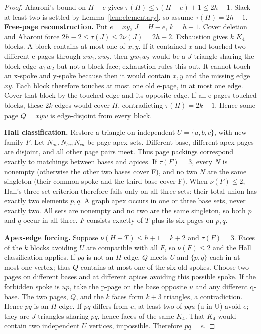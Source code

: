\documentclass[11pt]{article}
\theoremstyle{definition}\newtheorem{definition}[theorem]{Definition}
\theoremstyle{remark}\newtheorem{remark}[theorem]{Remark}
\begin{document}
\begin{proof}\leavevmode
Aharoni's bound on $H-e$ gives $\tau(H)\le\tau(H-e)+1\le2h-1$. Slack at least two is settled by Lemma~\ref{lem:elementary}, so assume $\tau(H)=2h-1$.
\textbf{Free-page reconstruction.} Put \(e=xy\), \(J=H-e\), \(k=h-1\). Cover deletion and Aharoni force \(2h-2\le \tau(J)\le 2\nu(J)=2h-2\). Exhaustion gives \(k\) \(K_4\) blocks. A block contains at most one of \(x,y\). If it contained \(x\) and touched two different e-pages through \(xw_1,xw_2\), then \(yw_1w_2\) would be a \(J\)-triangle sharing the block edge \(w_1w_2\) but not a block face; exhaustion rules this out. It cannot touch an x-spoke and y-spoke because then it would contain \(x,y\) and the missing edge \(xy\). Each block therefore touches at most one old e-page, in at most one edge. Cover that block by the touched edge and its opposite edge. If all e-pages touched blocks, these \(2k\) edges would cover \(H\), contradicting \(\tau(H)=2k+1\). Hence some page \(Q=xyw\) is edge-disjoint from every block.

\textbf{Hall classification.} Restore a triangle on independent \(U=\{a,b,c\}\), with new family \(F\). Let \(N_{ab},N_{bc},N_{ca}\) be page-apex sets. Different-base, different-apex pages are disjoint, and all other page pairs meet. Thus page packings correspond exactly to matchings between bases and apices. If \(\tau(F)=3\), every \(N\) is nonempty (otherwise the other two bases cover F), and no two \(N\) are the same singleton (their common spoke and the third base cover F). When \(\nu(F)\le 2\), Hall's three-set criterion therefore fails only on all three sets: their total union has exactly two elements \(p,q\). A graph apex occurs in one or three base sets, never exactly two. All sets are nonempty and no two are the same singleton, so both \(p\) and \(q\) occur in all three. \(F\) consists exactly of \(T\) plus its six pages on \(p,q\).

\textbf{Apex-edge forcing.} Suppose \(\nu(H+T)\le h+1=k+2\) and \(\tau(F)=3\). Faces of the \(k\) blocks avoiding \(U\) are compatible with all \(F\), so \(\nu(F)\le 2\) and the Hall classification applies. If \(pq\) is not an \(H\)-edge, \(Q\) meets \(U\) and \(\{p,q\}\) each in at most one vertex; thus \(Q\) contains at most one of the six old spokes. Choose two pages on different bases and at different apices avoiding this possible spoke. If the forbidden spoke is \(up\), take the p-page on the base opposite \(u\) and any different q-base. The two pages, \(Q\), and the \(k\) faces form \(k+3\) triangles, a contradiction. Hence \(pq\) is an \(H\)-edge. If \(pq\) differs from \(e\), at least two of \(pqu\) (u in U) avoid \(e\); they are \(J\)-triangles sharing \(pq\), hence faces of the same \(K_4\). That \(K_4\) would contain two independent \(U\) vertices, impossible. Therefore \(pq=e\).


\end{proof}
\end{document}
